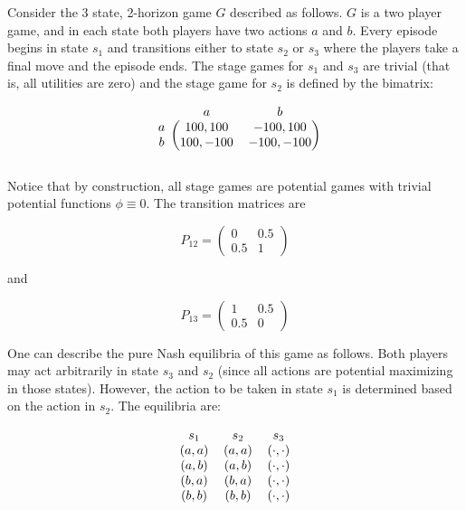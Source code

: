 \begin{eg}
Consider the 3 state, 2-horizon game $G$ described as follows. $G$ is a two player game, and in each state both players have two actions $a$ and $b$. Every episode begins in state $s_1$ and transitions either to state $s_2$ or $s_3$ where the players take a final move and the episode ends. The stage games for $s_1$ and $s_3$ are trivial (that is, all utilities are zero) and the stage game for $s_2$ is defined by the bimatrix:

\[
\begin{blockarray}{ccc}
 & a & b \\
\begin{block}{c(cc)}
  a & 100,100 & -100,100 \\
  b & 100,-100 & -100,-100 \\
\end{block}
\end{blockarray}
 \]

Notice that by construction, all stage games are potential games with trivial potential functions $\phi \equiv 0$. The transition matrices are

$$
P_{12} = 
\begin{pmatrix} 
0 & 0.5 \\
0.5 & 1 
\end{pmatrix}
$$

and

$$
P_{13} = 
\begin{pmatrix} 
1 & 0.5 \\
0.5 & 0
\end{pmatrix}
$$

One can describe the pure Nash equilibria of this game as follows. Both players may act arbitrarily in state $s_3$ and $s_2$ (since all actions are potential maximizing in those states). However, the action to be taken in state $s_1$ is determined based on the action in $s_2$. The equilibria are:

\[
\begin{blockarray}{ccc}
 s_1 & s_2 & s_3 \\
\begin{block}{ccc}
  (a,a) & (a,a) & (\cdot, \cdot) \\
  (a,b) & (a,b) & (\cdot, \cdot) \\
  (b,a) & (b,a) & (\cdot, \cdot) \\
  (b,b) & (b,b) & (\cdot, \cdot) \\
\end{block}
\end{blockarray}
 \]
 

\end{eg}
